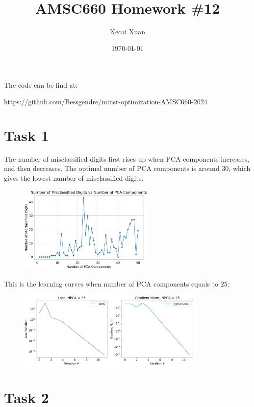\documentclass[12pt]{article}
\begin{document}
\setlength{\parindent}{0pt}

\title{AMSC660 Homework \#12}
\author{Kecai Xuan}
\date{\today}
\maketitle

The code can be find at:

https://github.com/Bessgendre/minst-optimization-AMSC660-2024

\section*{Task 1}

The number of misclassified digits first rises up when PCA components increases, and then decreases. The optimal number of PCA components is around 30, which gives the lowest number of misclassified digits.

\begin{figure}[ht]
    \centering
    \includegraphics[width=0.6\textwidth]{./imgs/component.png}
\end{figure}

This is the learning curves when number of PCA components equals to 25:
\begin{figure}[ht]
    \centering
    \includegraphics[width=0.82\textwidth]{./imgs/loss.png}
\end{figure}


\section*{Task 2}
\end{document}
